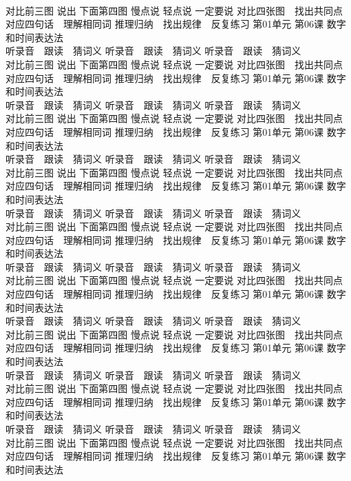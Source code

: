 \documentclass[8pt]{extreport}
\begin{document}
\begin{CJK}{UTF8}{min}
\\	对比前三图 说出 下面第四图 慢点说 轻点说 一定要说	对比四张图　找出共同点 对应四句话　理解相同词 推理归纳　找出规律　反复练习 第01单元 第06课 数字和时间表达法
\\	听录音　跟读　猜词义 听录音　跟读　猜词义 听录音　跟读　猜词义 
\\	对比前三图 说出 下面第四图 慢点说 轻点说 一定要说	对比四张图　找出共同点 对应四句话　理解相同词 推理归纳　找出规律　反复练习 第01单元 第06课 数字和时间表达法
\\	听录音　跟读　猜词义 听录音　跟读　猜词义 听录音　跟读　猜词义 
\\	对比前三图 说出 下面第四图 慢点说 轻点说 一定要说	对比四张图　找出共同点 对应四句话　理解相同词 推理归纳　找出规律　反复练习 第01单元 第06课 数字和时间表达法
\\	听录音　跟读　猜词义 听录音　跟读　猜词义 听录音　跟读　猜词义 
\\	对比前三图 说出 下面第四图 慢点说 轻点说 一定要说	对比四张图　找出共同点 对应四句话　理解相同词 推理归纳　找出规律　反复练习 第01单元 第06课 数字和时间表达法
\\	听录音　跟读　猜词义 听录音　跟读　猜词义 听录音　跟读　猜词义 
\\	对比前三图 说出 下面第四图 慢点说 轻点说 一定要说	对比四张图　找出共同点 对应四句话　理解相同词 推理归纳　找出规律　反复练习 第01单元 第06课 数字和时间表达法
\\	听录音　跟读　猜词义 听录音　跟读　猜词义 听录音　跟读　猜词义 
\\	对比前三图 说出 下面第四图 慢点说 轻点说 一定要说	对比四张图　找出共同点 对应四句话　理解相同词 推理归纳　找出规律　反复练习 第01单元 第06课 数字和时间表达法
\\	听录音　跟读　猜词义 听录音　跟读　猜词义 听录音　跟读　猜词义 
\\	对比前三图 说出 下面第四图 慢点说 轻点说 一定要说	对比四张图　找出共同点 对应四句话　理解相同词 推理归纳　找出规律　反复练习 第01单元 第06课 数字和时间表达法
\\	听录音　跟读　猜词义 听录音　跟读　猜词义 听录音　跟读　猜词义 
\\	对比前三图 说出 下面第四图 慢点说 轻点说 一定要说	对比四张图　找出共同点 对应四句话　理解相同词 推理归纳　找出规律　反复练习 第01单元 第06课 数字和时间表达法
\\	听录音　跟读　猜词义 听录音　跟读　猜词义 听录音　跟读　猜词义 
\\	对比前三图 说出 下面第四图 慢点说 轻点说 一定要说	对比四张图　找出共同点 对应四句话　理解相同词 推理归纳　找出规律　反复练习 第01单元 第06课 数字和时间表达法

\end{CJK}
\end{document}
